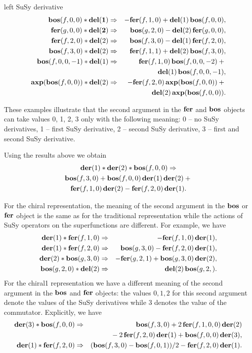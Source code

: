 {\begin{description}
\item{left SuSy derivative}
  \begin{eqnarray*}
    \mathbf{bos}(f,0,0)*\mathbf{\mathbf{del}(1)} &\Rightarrow& -\mathbf{fer}(f,1,0)+\mathbf{del}(1)\,\mathbf{bos}(f,0,0), \\
    \mathbf{fer}(g,0,0)*\mathbf{\mathbf{del}(2)} &\Rightarrow&  \mathbf{bos}(g,2,0)-\mathbf{del}(2)\,\mathbf{fer}(g,0,0), \\
    \mathbf{fer}(f,2,0)*\mathbf{del}(2) &\Rightarrow& \mathbf{bos}(f,3,0)-\mathbf{del}(1)\,\mathbf{fer}(f,2,0), \\
    \mathbf{bos}(f,3,0)*\mathbf{del}(2) &\Rightarrow& \mathbf{fer}(f,1,1)+\mathbf{del}(2)\,\mathbf{bos}(f,3,0), \\
    \mathbf{bos}(f,0,0,-1)*\mathbf{del}(1) &\Rightarrow& \mathbf{fer}(f,1,0)\,\mathbf{bos}(f,0,0,-2) + \mbox{}\\
    && \mathbf{del}(1)\,\mathbf{bos}(f,0,0,-1), \\
    \mathbf{axp}(\mathbf{bos}(f,0,0))*\mathbf{del}(2) &\Rightarrow&
    -\mathbf{fer}(f,2,0)\,\mathbf{axp}(\mathbf{bos}(f,0,0)) + \mbox{}\\
    && \mathbf{del}(2)\,\mathbf{axp}(\mathbf{bos}(f,0,0)).
  \end{eqnarray*}
\end{description}

These examples illustrate that the second argument in the $\mathbf{fer}$ and
$\mathbf{bos}$ objects can take values 0, 1, 2, 3 only with the following
meaning: 0 -- no SuSy derivatives, 1 -- first SuSy derivative, 2 --
second SuSy derivative, 3 -- first and second SuSy derivative.

Using the results above we obtain
\begin{multline*}
  \mathbf{der}(1)*\mathbf{der}(2)*\mathbf{bos}(f,0,0) \Rightarrow \\
  \mathbf{bos}(f,3,0) + \mathbf{bos}(f,0,0)\,\mathbf{der}(1)\,\mathbf{der}(2) + \mbox{} \\
  \mathbf{fer}(f,1,0)\,\mathbf{der}(2) - \mathbf{fer}(f,2,0)\,\mathbf{der}(1).
\end{multline*}

For the chiral representation, the meaning of the second argument in
the $\mathbf{bos}$ or $\mathbf{fer}$ object is the same as for the traditional
representation while the actions of SuSy operators on the
superfunctions are different.  For example, we have
\begin{eqnarray*}
  \mathbf{der}(1)*\mathbf{fer}(f,1,0) &\Rightarrow& -\mathbf{fer}(f,1,0)\,\mathbf{der}(1), \\
  \mathbf{der}(1)*\mathbf{fer}(f,2,0) &\Rightarrow& \mathbf{bos}(g,3,0) - \mathbf{fer}(f,2,0)\,\mathbf{der}(1), \\
  \mathbf{der}(2)*\mathbf{bos}(g,3,0) &\Rightarrow& -\mathbf{fer}(g,2,1) + \mathbf{bos}(g,3,0)\,\mathbf{der}(2), \\
  \mathbf{bos}(g,2,0)*\mathbf{del}(2) &\Rightarrow& \mathbf{del}(2)\,\mathbf{bos}(g,2,).
\end{eqnarray*}
For the chiral1 representation we have a different meaning of the
second argument in the $\mathbf{bos}$ and $\mathbf{fer}$ objects: the values $0,1,2$
for this second argument denote the values of the SuSy derivatives
while 3 denotes the value of the commutator.  Explicitly, we have
\begin{eqnarray*}
  \mathbf{der}(3)*\mathbf{bos}(f,0,0) &\Rightarrow& \mathbf{bos}(f,3,0) + 2\,\mathbf{fer}(f,1,0,0)\,\mathbf{der}(2) \\
  && \mbox{} - 2\,\mathbf{fer}(f,2,0)\,\mathbf{der}(1) + \mathbf{bos}(f,0,0)\,\mathbf{der}(3), \\
  \mathbf{der}(1)*\mathbf{fer}(f,2,0) &\Rightarrow& (\mathbf{bos}(f,3,0)-\mathbf{bos}(f,0,1))/2 - \mathbf{fer}(f,2,0)\,\mathbf{der}(1).
\end{eqnarray*}

}
